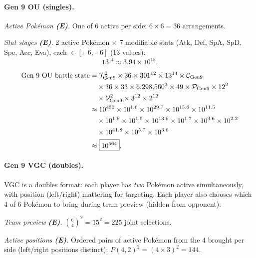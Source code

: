 \paragraph{Gen 9 OU (singles).}

\emph{Active Pokémon \textbf{(E)}.}
One of 6 active per side: $6 \times 6 = 36$ arrangements.

\emph{Stat stages \textbf{(E)}.}
2 active Pokémon × 7 modifiable stats (Atk, Def, SpA, SpD, Spe, Acc, Eva), each $\in [-6,+6]$ (13 values):
\begin{equation}
    13^{14} \approx 3.94 \times 10^{15}.
\end{equation}

\begin{align}
    \text{Gen 9 OU battle state}
    &= \mathcal{T}_{\text{Gen9}}^2 \times 36 \times 301^{12} \times 13^{14} \times \mathcal{C}_{\text{Gen9}} \notag \\
    &\quad \times 36 \times 33 \times 6{,}298{,}560^2 \times 49 \times \mathcal{P}_{\text{Gen9}} \times 12^2 \notag \\
    &\quad \times \mathcal{V}_{\text{Gen9}}^{2} \times 3^{12} \times 2^{12} \notag \\
    &\approx 10^{430} \times 10^{1.6} \times 10^{29.7} \times 10^{15.6} \times 10^{11.5} \notag \\
    &\quad \times 10^{1.6} \times 10^{1.5} \times 10^{13.6} \times 10^{1.7} \times 10^{3.6} \times 10^{2.2} \notag \\
    &\quad \times 10^{41.8} \times 10^{5.7} \times 10^{3.6} \notag \\
    &\approx \boxed{10^{564}}.
    \label{eq:gen9-ou-battle}
\end{align}

\paragraph{Gen 9 VGC (doubles).}

VGC is a doubles format: each player has \emph{two} Pokémon active simultaneously, with position (left/right) mattering for targeting.
Each player also chooses which 4 of 6 Pokémon to bring during team preview (hidden from opponent).

\emph{Team preview \textbf{(E)}.}
$\binom{6}{4}^2 = 15^2 = 225$ joint selections.

\emph{Active positions \textbf{(E)}.}
Ordered pairs of active Pokémon from the 4 brought per side (left/right positions distinct): $P(4,2)^2 = (4 \times 3)^2 = 144$.

